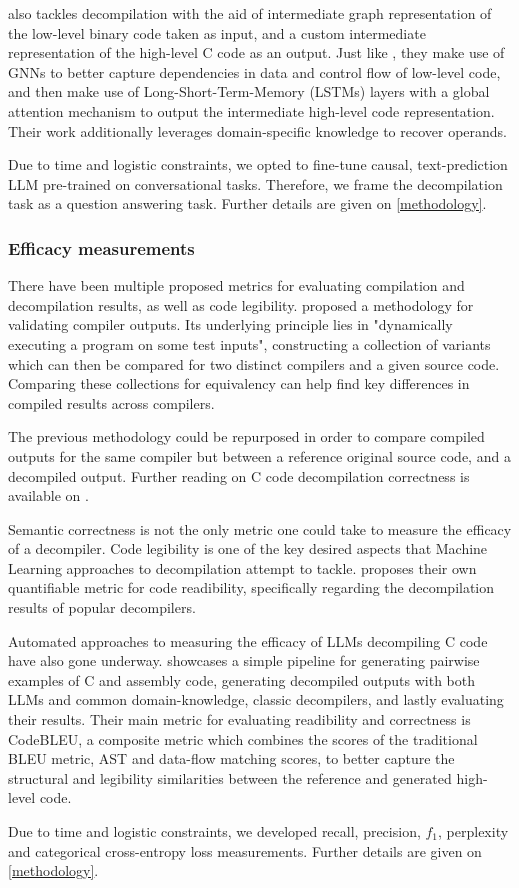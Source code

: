 \documentclass[../main.tex]{subfiles}
\begin{document}
\cite{cao_boosting_2022} also tackles decompilation with the aid of intermediate
graph representation of the low-level binary code taken as input, and a custom
intermediate representation of the high-level C code as an output. Just like 
\cite{fu_n-bref_2020}, they make use of GNNs to better capture dependencies in 
data and control flow of low-level code, and then make use of Long-Short-Term-Memory
(LSTMs) layers with a global attention mechanism to output the intermediate high-level
code representation.  Their work additionally leverages domain-specific knowledge
to recover operands.

Due to time and logistic constraints, we opted to fine-tune causal, text-prediction
LLM pre-trained on conversational tasks. Therefore, we frame the decompilation task
as a question answering task. Further details are given on \ref{methodology}.

\subsubsection{Efficacy measurements}

There have been multiple proposed metrics for evaluating compilation and decompilation
results, as well as code legibility. \cite{le_compiler_2014} proposed a methodology
for validating compiler outputs. Its underlying principle lies in "dynamically
executing a program on some test inputs", constructing a collection of variants
which can then be compared for two distinct compilers and a given source code.
Comparing these collections for equivalency can help find key differences in compiled
results across compilers.

The previous methodology could be repurposed in order to compare compiled outputs
for the same compiler but between a reference original source code, and a decompiled
output. Further reading on C code decompilation correctness is available on 
\cite{liu_how_2020}.

Semantic correctness is not the only metric one could take to measure the efficacy
of a decompiler. Code legibility is one of the key desired aspects that Machine
Learning approaches to decompilation attempt to tackle. \cite{eom_r2i_2024} proposes
their own quantifiable metric for code readibility, specifically regarding the
decompilation results of popular decompilers.

Automated approaches to measuring the efficacy of LLMs decompiling C code have also
gone underway. \cite{vaaden_using_2024} showcases a simple pipeline for generating
pairwise examples of C and assembly code, generating decompiled outputs with both 
LLMs and common domain-knowledge, classic decompilers, and lastly evaluating their
results. Their main metric for evaluating readibility and correctness is CodeBLEU, a
composite metric \cite{ren2020codebleumethodautomaticevaluation} which combines the
scores of the traditional BLEU metric, AST and data-flow matching scores, to better
capture the structural and legibility similarities between the reference and generated
high-level code.

Due to time and logistic constraints, we developed recall, precision, $f_1$, 
perplexity and categorical cross-entropy loss measurements. Further details are
given on \ref{methodology}.
\end{document}
